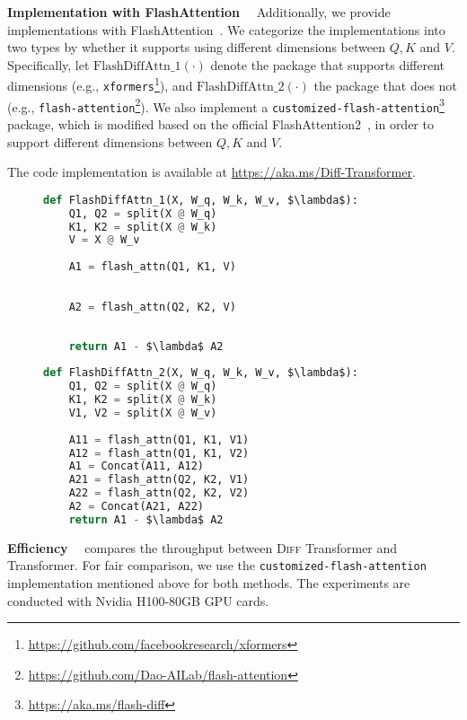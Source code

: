 \documentclass{article}
\newcommand{\mypara}[1]{\textbf{#1}~~}
\newcommand\diff{\textsc{Diff} Transformer}
\begin{document}
\mypara{Implementation with FlashAttention}
Additionally, we provide implementations with FlashAttention~\citep{fa}.
We categorize the implementations into two types by whether it supports using different dimensions between $Q, K$ and $V$.
Specifically, let $\operatorname{FlashDiffAttn\_1(\cdot)}$ denote the package that supports different dimensions (e.g., \texttt{xformers}\footnote{\url{https://github.com/facebookresearch/xformers}}), and $\operatorname{FlashDiffAttn\_2(\cdot)}$ the package that does not (e.g., \texttt{flash-attention}\footnote{\url{https://github.com/Dao-AILab/flash-attention}}).
We also implement a \texttt{customized-flash-attention}\footnote{\url{https://aka.ms/flash-diff}} package, which is modified based on the official FlashAttention2~\citep{fa2}, in order to support different dimensions between $Q, K$ and $V$.

The code implementation is available at \url{https://aka.ms/Diff-Transformer}.

\begin{figure}[h]
\centering
\begin{minipage}[t]{0.49\linewidth}
\centering
\begin{lstlisting}[language=python, mathescape, breaklines=true]  
def FlashDiffAttn_1(X, W_q, W_k, W_v, $\lambda$):
    Q1, Q2 = split(X @ W_q)
    K1, K2 = split(X @ W_k)
    V = X @ W_v
    
    A1 = flash_attn(Q1, K1, V)
    
    
    A2 = flash_attn(Q2, K2, V)
    
    
    return A1 - $\lambda$ A2
\end{lstlisting}
\end{minipage}\hfill
\begin{minipage}[t]{0.49\linewidth}
\centering
\begin{lstlisting}[language=python, mathescape, breaklines=true]
def FlashDiffAttn_2(X, W_q, W_k, W_v, $\lambda$):
    Q1, Q2 = split(X @ W_q)
    K1, K2 = split(X @ W_k)
    V1, V2 = split(X @ W_v)
    
    A11 = flash_attn(Q1, K1, V1)
    A12 = flash_attn(Q1, K1, V2)
    A1 = Concat(A11, A12)
    A21 = flash_attn(Q2, K2, V1)
    A22 = flash_attn(Q2, K2, V2)
    A2 = Concat(A21, A22)
    return A1 - $\lambda$ A2
\end{lstlisting}
\end{minipage}
\end{figure}


\mypara{Efficiency}
 compares the throughput between \diff{} and Transformer.
For fair comparison, we use the \texttt{customized-flash-attention} implementation mentioned above for both methods. The experiments are conducted with Nvidia H100-80GB GPU cards.
\end{document}
